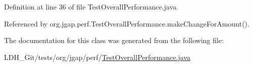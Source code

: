 Definition at line 36 of file Test\-Overall\-Performance.\-java.



Referenced by org.\-jgap.\-perf.\-Test\-Overall\-Performance.\-make\-Change\-For\-Amount().



The documentation for this class was generated from the following file\-:\begin{DoxyCompactItemize}
\item 
L\-D\-H\-\_\-\-Git/tests/org/jgap/perf/\hyperlink{_test_overall_performance_8java}{Test\-Overall\-Performance.\-java}\end{DoxyCompactItemize}
